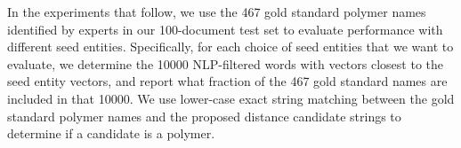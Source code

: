 In the experiments that follow,
we use the 467 gold standard polymer names identified by experts in our 100-document test set to
evaluate performance with different seed entities.
Specifically, for each choice of seed entities that we want to evaluate,
we determine the \num{10000} NLP-filtered words with vectors closest to the seed entity vectors, 
and report what fraction of the 467 gold standard names are included in that \num{10000}.
We use lower-case exact string matching between the gold standard polymer names and the proposed distance candidate strings to determine if a candidate is a polymer.

